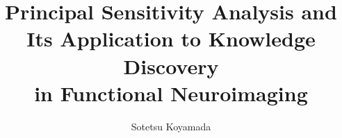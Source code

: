 \documentclass[a4paper]{scrartcl}
\begin{document}
\title{
Principal Sensitivity Analysis and\\Its Application to Knowledge Discovery\\in Functional Neuroimaging
}

\author[]{
Sotetsu Koyamada
}


\date{}

\maketitle

\clearpage
\tableofcontents
\clearpage

\clearpage

\clearpage

\clearpage

\clearpage

\clearpage

\clearpage


\clearpage
\appendix

\end{document}
